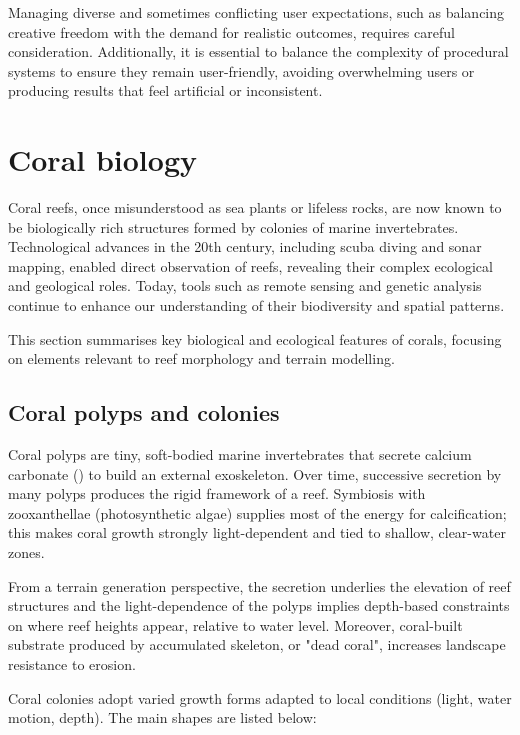 Managing diverse and sometimes conflicting user expectations, such as balancing creative freedom with the demand for realistic outcomes, requires careful consideration. Additionally, it is essential to balance the complexity of procedural systems to ensure they remain user-friendly, avoiding overwhelming users or producing results that feel artificial or inconsistent.


\section{Coral biology}
\label{sec:state-of-the-art_biology}

Coral reefs, once misunderstood as sea plants or lifeless rocks, are now known to be biologically rich structures formed by colonies of marine invertebrates. Technological advances in the 20th century, including scuba diving and sonar mapping, enabled direct observation of reefs, revealing their complex ecological and geological roles. Today, tools such as remote sensing and genetic analysis continue to enhance our understanding of their biodiversity and spatial patterns.

This section summarises key biological and ecological features of corals, focusing on elements relevant to reef morphology and terrain modelling.

\subsection{Coral polyps and colonies}
Coral polyps are tiny, soft-bodied marine invertebrates that secrete calcium carbonate () to build an external exoskeleton. Over time, successive secretion by many polyps produces the rigid framework of a reef. Symbiosis with zooxanthellae (photosynthetic algae) supplies most of the energy for calcification; this makes coral growth strongly light-dependent and tied to shallow, clear-water zones.

From a terrain generation perspective, the  secretion underlies the elevation of reef structures and the light-dependence of the polyps implies depth-based constraints on where reef heights appear, relative to water level. Moreover, coral-built substrate produced by accumulated skeleton, or "dead coral", increases landscape resistance to erosion.

Coral colonies adopt varied growth forms adapted to local conditions (light, water motion, depth). The main shapes are listed below:

